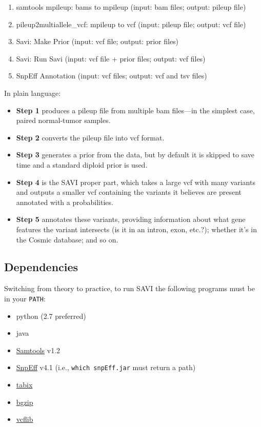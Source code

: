\documentclass[letterpaper,14pt]{memoir}
\begin{document}
\begin{enumerate}
\def\labelenumi{\arabic{enumi}.}
\tightlist
\item
  samtools mpileup: bams to mpileup (input: bam files; output: pileup file)
\item
  pileup2multiallele\_vcf: mpileup to vcf (input: pileup file; output: vcf file)
\item
  Savi: Make Prior (input: vcf file; output: prior files)
\item
  Savi: Run Savi (input: vcf file + prior files; output: vcf files)
\item
  SnpEff Annotation (input: vcf files; output: vcf and tsv files)
\end{enumerate}

\noindent In plain language:

\begin{itemize}
\tightlist
\item
  \textbf{Step 1} produces a pileup file from multiple bam files---in the simplest case, paired normal-tumor samples.
\item
  \textbf{Step 2} converts the pileup file into vcf format.
\item
  \textbf{Step 3} generates a prior from the data, but by default it is skipped to save time and a standard diploid prior is used.
\item
  \textbf{Step 4} is the SAVI proper part, which takes a large vcf with many variants and outputs a smaller vcf containing the variants it believes are present annotated with a probabilities.
\item
  \textbf{Step 5} annotates these variants, providing information about what gene features the variant intersects (is it in an intron, exon, etc.?); whether it's in the Cosmic database; and so on. 
\end{itemize}

\subsection{Dependencies}\label{dependencies}

Switching from theory to practice, to run SAVI the following programs must be in your \texttt{PATH}:

\begin{itemize}
\tightlist
\item
  python (2.7 preferred)
\item
  java
\item
  \href{http://samtools.sourceforge.net}{Samtools} v1.2
\item
  \href{http://snpeff.sourceforge.net}{SnpEff} v4.1 (i.e., \texttt{which\ snpEff.jar} must return a path)
\item
  \href{http://samtools.sourceforge.net/tabix.shtml}{tabix}
\item
  \href{http://samtools.sourceforge.net/tabix.shtml}{bgzip}
\item
  \href{https://github.com/ekg/vcflib}{vcflib}
\end{itemize}
\end{document}
